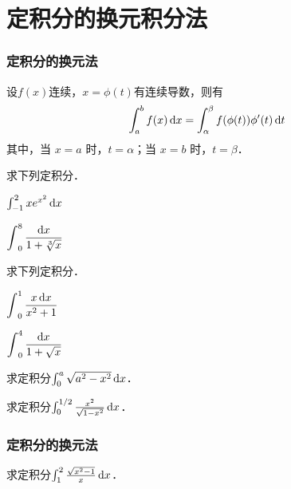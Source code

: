 \documentclass[14pt,notheorems,leqno,xcolor={rgb}]{beamer} %
\begin{document}
\section{定积分的换元积分法}

\begin{frame}
\frametitle{定积分的换元法}
设$f(x)$连续，$x=\phi(t)$有连续导数，则有
\[ \int_a^bf(x)\mathop{}\!\mathrm{d}{x}=\int_\alpha^\beta f(\phi(t))\phi'(t)\mathop{}\!\mathrm{d}{t} \]
其中，当 $x=a$ 时，$t=\alpha$；当 $x=b$ 时，$t=\beta$．
\end{frame}

\begin{frame}
\begin{example}求下列定积分．
\begin{enumlite}
  \item $\int_{-1}^{2}xe^{x^2}\mathop{}\!\mathrm{d} x$
  \item $\Int_0^8 \dfrac{\d x}{1+\sqrt[3]x}$
\end{enumlite}
\end{example}
\pause
\begin{exercise}求下列定积分．
\begin{enumlite}
  \item $\Int_0^1 \dfrac{x\d x}{x^2+1}$
  \item $\Int_0^4 \dfrac{\d x}{1+\sqrt{x}}$
\end{enumlite}
\end{exercise}
\end{frame}

\begin{frame}
\begin{example}
求定积分$\int_0^a \sqrt{a^2-x^2}\mathop{}\!\mathrm{d} x$．
\end{example}
\pause
\begin{exercise}
求定积分$\int_0^{1/2} \frac{x^2}{\sqrt{1-x^2}}\mathop{}\!\mathrm{d} x$．
\end{exercise}
\end{frame}

\begin{iframe}
\frametitle{定积分的换元法}
\begin{exercise}
求定积分$\int_1^2 \frac{\sqrt{x^2-1}}{x}\mathop{}\!\mathrm{d} x$．
\end{exercise}
\end{iframe}
\end{document}
